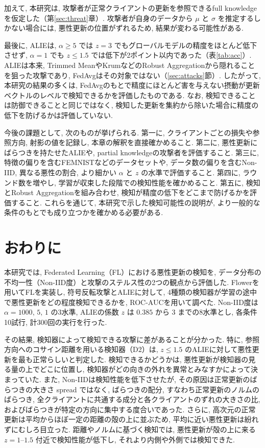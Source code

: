 \documentclass[a4j, twocolumn, dvipdfmx]{jsarticle}
\newcommand{\Spread}{\textrm{spread}}
\begin{document}
加えて, 本研究は, 攻撃者が正常クライアントの更新を参照できるfull knowledgeを仮定した（第\ref{sec:threat}章）. 攻撃者が自身のデータから $\mu$ と $\sigma$ を推定するしかない場合には, 悪性更新の位置がずれるため, 結果が変わる可能性がある.

最後に, ALIEは, $\alpha \ge 5$ では $z=3$ でもグローバルモデルの精度をほとんど低下させず, $\alpha=1$ でも $z \le 1.5$ では低下が2ポイント以内であった（表\ref{tab:acc}）. ALIEは本来, Trimmed MeanやKrumなどのRobust Aggregationから隠れることを狙った攻撃であり, FedAvgはその対象ではない（\ref{sec:attacks}節）. したがって, 本研究の結果の多くは, FedAvgのもとで精度にほとんど害を与えない摂動が更新ベクトルのレベルで検知できるかを評価したものである. なお, 検知できることは防御できることと同じではなく, 検知した更新を集約から除いた場合に精度の低下を防げるかは評価していない.

今後の課題として, 次のものが挙げられる. 第一に, クライアントごとの損失や参照方向, 射影の値を記録し, 本章の解釈を直接確かめること. 第二に, 悪性更新にばらつきを持たせたALIEや, partial knowledgeの攻撃者を評価すること. 第三に, 特徴の偏りを含むFEMNISTなどのデータセットや, データ数の偏りを含むNon-IID, 異なる悪性の割合, より細かい $\alpha$ と $z$ の水準で評価すること. 第四に, ラウンド数を増やし, 学習が収束した段階での検知性能を確かめること. 第五に, 検知とRobust Aggregationを組み合わせ, 検知が精度の低下をどこまで防げるかを評価すること. これらを通じて, 本研究で示した検知可能性の説明が, より一般的な条件のもとでも成り立つかを確かめる必要がある.

\section{おわりに}
\label{sec:conclusion}

本研究では, Federated Learning（FL）における悪性更新の検知を, データ分布の不均一性（Non-IID度）と攻撃のステルス性の2つの観点から評価した. Flowerを用いてFLを実装し, 符号反転攻撃とALIEに対して, 4種類の検知器が学習の途中で悪性更新をどの程度検知できるかを, ROC-AUCを用いて調べた. Non-IID度は $\alpha=1000,\,5,\,1$ の3水準, ALIEの係数 $z$ は $0.385$ から $3$ までの8水準とし, 各条件10試行, 計300回の実行を行った.

その結果, 検知器によって検知できる攻撃に差があることが分かった. 特に, 参照方向へのコサイン距離を用いる検知器（D2）は, $z \le 1.5$ のALIEに対して悪性更新を最も正常らしいと判定した. 検知できるかどうかは, 悪性更新が検知器の見る量の上でどこに位置し, 検知器がどの向きの外れを異常とみなすかによって決まっていた. また, Non-IIDは検知性能を低下させたが, その原因は正常更新のばらつきの大きさ \Spread{} ではなく, ばらつきの配分, すなわち正常更新のノルムのばらつき, 全クライアントに共通する成分と各クライアントのずれの大きさの比, およびばらつきが特定の方向に集中する度合いであった. さらに, 高次元の正常更新は平均からほぼ一定の距離の殻の上に並ぶため, 平均に近い悪性更新は紛れずにむしろ目立った. 距離やノルムに基づく検知では, 悪性更新が殻の上に来る $z=1$--$1.5$ 付近で検知性能が低下し, それより内側や外側では検知できた.
\end{document}
